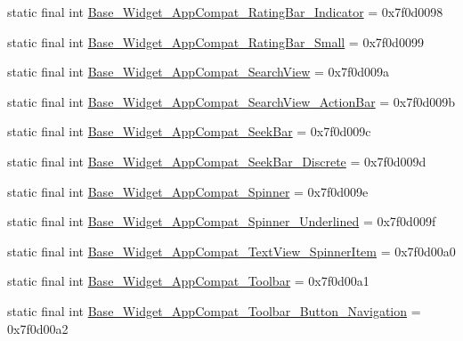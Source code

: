\begin{DoxyCompactItemize}
\item 
static final int \mbox{\hyperlink{classcom_1_1synnapps_1_1carouselview_1_1_r_1_1style_aefa5c6ef2793483e66939549d7a13928}{Base\+\_\+\+Widget\+\_\+\+App\+Compat\+\_\+\+Rating\+Bar\+\_\+\+Indicator}} = 0x7f0d0098
\item 
static final int \mbox{\hyperlink{classcom_1_1synnapps_1_1carouselview_1_1_r_1_1style_ac4f189b743c6c7b86ec90208368f8d57}{Base\+\_\+\+Widget\+\_\+\+App\+Compat\+\_\+\+Rating\+Bar\+\_\+\+Small}} = 0x7f0d0099
\item 
static final int \mbox{\hyperlink{classcom_1_1synnapps_1_1carouselview_1_1_r_1_1style_a811300f567ace600cd92c5ba052f45bf}{Base\+\_\+\+Widget\+\_\+\+App\+Compat\+\_\+\+Search\+View}} = 0x7f0d009a
\item 
static final int \mbox{\hyperlink{classcom_1_1synnapps_1_1carouselview_1_1_r_1_1style_a93b219c3e884dc19f3c066e31b2ca9ca}{Base\+\_\+\+Widget\+\_\+\+App\+Compat\+\_\+\+Search\+View\+\_\+\+Action\+Bar}} = 0x7f0d009b
\item 
static final int \mbox{\hyperlink{classcom_1_1synnapps_1_1carouselview_1_1_r_1_1style_a398c030fe8ea838a8f4686af439699a2}{Base\+\_\+\+Widget\+\_\+\+App\+Compat\+\_\+\+Seek\+Bar}} = 0x7f0d009c
\item 
static final int \mbox{\hyperlink{classcom_1_1synnapps_1_1carouselview_1_1_r_1_1style_a3fc1ae6777e45b09663dff5a602b0c06}{Base\+\_\+\+Widget\+\_\+\+App\+Compat\+\_\+\+Seek\+Bar\+\_\+\+Discrete}} = 0x7f0d009d
\item 
static final int \mbox{\hyperlink{classcom_1_1synnapps_1_1carouselview_1_1_r_1_1style_ab0be3fdc6b966f80af49b016fc80d4e0}{Base\+\_\+\+Widget\+\_\+\+App\+Compat\+\_\+\+Spinner}} = 0x7f0d009e
\item 
static final int \mbox{\hyperlink{classcom_1_1synnapps_1_1carouselview_1_1_r_1_1style_af7f70edd3cb4ec7e7753a173b7ffcfcf}{Base\+\_\+\+Widget\+\_\+\+App\+Compat\+\_\+\+Spinner\+\_\+\+Underlined}} = 0x7f0d009f
\item 
static final int \mbox{\hyperlink{classcom_1_1synnapps_1_1carouselview_1_1_r_1_1style_afe168881b4722c738fbfafc2e0323442}{Base\+\_\+\+Widget\+\_\+\+App\+Compat\+\_\+\+Text\+View\+\_\+\+Spinner\+Item}} = 0x7f0d00a0
\item 
static final int \mbox{\hyperlink{classcom_1_1synnapps_1_1carouselview_1_1_r_1_1style_a178146b51eb152bae72b1e86a9826f82}{Base\+\_\+\+Widget\+\_\+\+App\+Compat\+\_\+\+Toolbar}} = 0x7f0d00a1
\item 
static final int \mbox{\hyperlink{classcom_1_1synnapps_1_1carouselview_1_1_r_1_1style_a4fc2d2710e8a01a0ff03643e46cb3105}{Base\+\_\+\+Widget\+\_\+\+App\+Compat\+\_\+\+Toolbar\+\_\+\+Button\+\_\+\+Navigation}} = 0x7f0d00a2

\end{DoxyCompactItemize}
